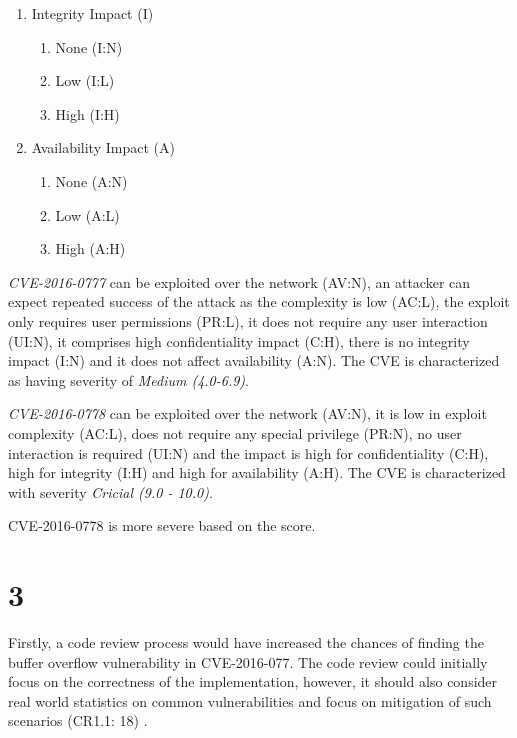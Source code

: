 \documentclass[a4paper, 12pt]{article}
\begin{document}
\begin{multicols}{2}
\begin{enumerate}
      \item Integrity Impact (I)
          \begin{enumerate}
              \item None (I:N)
              \item Low (I:L)
              \item High (I:H)
          \end{enumerate}

      \item Availability Impact (A)
          \begin{enumerate}
              \item None (A:N)
              \item Low (A:L)
              \item High (A:H)
          \end{enumerate}
  \end{enumerate}
\end{multicols}

\textit{CVE-2016-0777} can be exploited over the network (AV:N), an attacker can expect repeated success of the attack as the complexity is low (AC:L), the exploit only requires user permissions (PR:L), it does not require any user interaction (UI:N), it comprises high confidentiality impact (C:H), there is no integrity impact (I:N) and it does not affect availability (A:N). The CVE is characterized as having severity of \textit{Medium (4.0-6.9)}.

\textit{CVE-2016-0778} can be exploited over the network (AV:N), it is low in exploit complexity (AC:L), does not require any special privilege (PR:N), no user interaction is required (UI:N) and the impact is high for confidentiality (C:H), high for integrity (I:H) and high for availability (A:H). The CVE is characterized with severity \textit{Cricial (9.0 - 10.0)}.

CVE-2016-0778 is more severe based on the score.

\setcounter{section}{2}
\section*{3}
Firstly, a code review process would have increased the chances of finding the buffer overflow vulnerability in CVE-2016-077. The code review could initially focus on the correctness of the implementation, however, it should also consider real world statistics on common vulnerabilities and focus on mitigation of such scenarios (CR1.1: 18) \cite{BSIMM6-CodeReview}.
\end{document}
